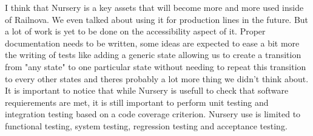 \documentclass[12pt]{article}
\theoremstyle{definition}
\theoremstyle{definition}
\theoremstyle{remark}
\begin{document}
I think that Nursery is a key assets that will become more and more used inside of Railnova. We even talked about using it for production lines in the future. But a lot of work is yet to be done on the accessibility aspect of it. Proper documentation needs to be written, some ideas are expected to ease a bit more the writing of tests like adding a generic state allowing us to create a transition from "any state" to one particular state without needing to repeat this transition to every other states and theres probably a lot more thing we didn't think about.\\

It is important to notice that while Nursery is usefull to check that software requierements are met, it is still important to perform unit testing and integration testing based on a code coverage criterion. Nursery use is limited to functional testing, system testing, regression testing and acceptance testing.

\end{document}
